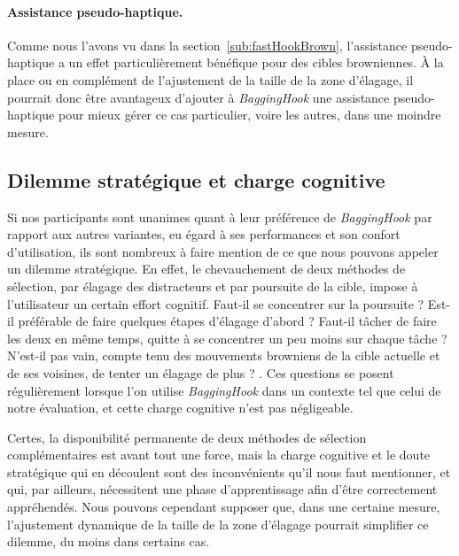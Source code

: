 	\paragraph{Assistance pseudo-haptique.}
	Comme nous l'avons vu dans la section~\ref{sub:fastHookBrown}, l'assistance pseudo-haptique a un effet particulièrement bénéfique pour des cibles browniennes. À la place ou en complément de l'ajustement de la taille de la zone d'élagage, il pourrait donc être avantageux d'ajouter à \emph{BaggingHook} une assistance pseudo-haptique pour mieux gérer ce cas particulier, voire les autres, dans une moindre mesure.
	
	\subsection{Dilemme stratégique et charge cognitive}
	Si nos participants sont unanimes quant à leur préférence de \emph{BaggingHook} par rapport aux autres variantes, eu égard à ses performances et son confort d'utilisation, ils sont nombreux à faire mention de ce que nous pouvons appeler un dilemme stratégique. En effet, le chevauchement de deux méthodes de sélection, par élagage des distracteurs et par poursuite de la cible, impose à l'utilisateur un certain effort cognitif. \og Faut-il se concentrer sur la poursuite ? Est-il préférable de faire quelques étapes d'élagage d'abord ? Faut-il tâcher de faire les deux en même temps, quitte à se concentrer un peu moins sur chaque tâche ? N'est-il pas vain, compte tenu des mouvements browniens de la cible actuelle et de ses voisines, de tenter un élagage de plus ? \fg{}. Ces questions se posent régulièrement lorsque l'on utilise \emph{BaggingHook} dans un contexte tel que celui de notre évaluation, et cette \og charge cognitive \fg{} n'est pas négligeable.
	
	Certes, la disponibilité permanente de deux méthodes de sélection complémentaires est avant tout une force, mais la charge cognitive et le doute stratégique qui en découlent sont des inconvénients qu'il nous faut mentionner, et qui, par ailleurs, nécessitent une phase d'apprentissage afin d'être correctement appréhendés. Nous pouvons cependant supposer que, dans une certaine mesure, l'ajustement dynamique de la taille de la zone d'élagage pourrait simplifier ce dilemme, du moins dans certains cas.
	
